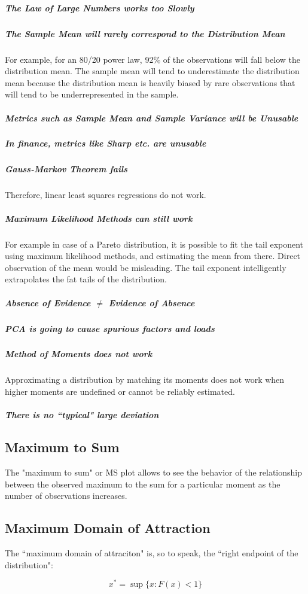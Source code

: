\subparagraph{The Law of Large Numbers works too Slowly}

\subparagraph{The Sample Mean will rarely correspond to the Distribution Mean}
For example, for an 80/20 power law, 92\% of the observations will fall below the distribution mean. The sample mean will tend to underestimate the distribution mean because the distribution mean is heavily biased by rare observations that will tend to be underrepresented in the sample.

\subparagraph{Metrics such as Sample Mean and Sample Variance will be Unusable}

\subparagraph{In finance, metrics like Sharp etc. are unusable}

\subparagraph{Gauss-Markov Theorem fails}
Therefore, linear least squares regressions do not work. 

\subparagraph{Maximum Likelihood Methods can still work}
For example in case of a Pareto distribution, it is possible to fit the tail exponent using maximum likelihood methods, and estimating the mean from there. Direct observation of the mean would be misleading. The tail exponent intelligently extrapolates the fat tails of the distribution.

\subparagraph{Absence of Evidence $\neq$ Evidence of Absence}

\subparagraph{PCA is going to cause spurious factors and loads}

\subparagraph{Method of Moments does not work}
Approximating a distribution by matching its moments does not work when higher moments are undefined or cannot be reliably estimated.

\subparagraph{There is no ``typical" large deviation}


\subsection{Maximum to Sum}
The "maximum to sum" or MS plot allows to see the behavior of the relationship between the observed maximum to the sum for a particular moment as the number of observations increases. 

\subsection{Maximum Domain of Attraction}

The ``maximum domain of attraciton" is, so to speak, the ``right endpoint of the distribution":

\begin{equation}
x^* = \sup\{x: F(x) < 1 \}
\end{equation}

